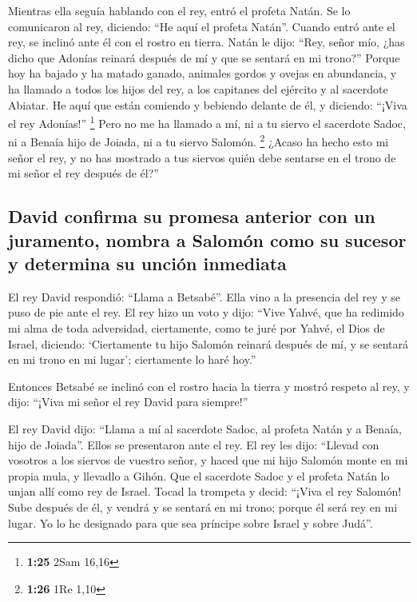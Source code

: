  Mientras ella seguía hablando con el rey, entró el
profeta Natán.  Se lo comunicaron al rey, diciendo: ``He
aquí el profeta Natán''. Cuando entró ante el rey, se inclinó ante él
con el rostro en tierra.  Natán le dijo: ``Rey, señor
mío, ¿has dicho que Adonías reinará después de mí y que se sentará en mi
trono?''  Porque hoy ha bajado y ha matado ganado,
animales gordos y ovejas en abundancia, y ha llamado a todos los hijos
del rey, a los capitanes del ejército y al sacerdote Abiatar. He aquí
que están comiendo y bebiendo delante de él, y diciendo: ``¡Viva el rey
Adonías!'' \footnote{\textbf{1:25} 2Sam 16,16}  Pero no
me ha llamado a mí, ni a tu siervo el sacerdote Sadoc, ni a Benaía hijo
de Joiada, ni a tu siervo Salomón. \footnote{\textbf{1:26} 1Re 1,10}
 ¿Acaso ha hecho esto mi señor el rey, y no has mostrado
a tus siervos quién debe sentarse en el trono de mi señor el rey después
de él?''

\hypertarget{david-confirma-su-promesa-anterior-con-un-juramento-nombra-a-salomuxf3n-como-su-sucesor-y-determina-su-unciuxf3n-inmediata}{%
\subsection{David confirma su promesa anterior con un juramento, nombra
a Salomón como su sucesor y determina su unción
inmediata}\label{david-confirma-su-promesa-anterior-con-un-juramento-nombra-a-salomuxf3n-como-su-sucesor-y-determina-su-unciuxf3n-inmediata}}

 El rey David respondió: ``Llama a Betsabé''. Ella vino a
la presencia del rey y se puso de pie ante el rey.  El
rey hizo un voto y dijo: ``Vive Yahvé, que ha redimido mi alma de toda
adversidad,  ciertamente, como te juré por Yahvé, el Dios
de Israel, diciendo: `Ciertamente tu hijo Salomón reinará después de mí,
y se sentará en mi trono en mi lugar'; ciertamente lo haré hoy.''

 Entonces Betsabé se inclinó con el rostro hacia la
tierra y mostró respeto al rey, y dijo: ``¡Viva mi señor el rey David
para siempre!''

 El rey David dijo: ``Llama a mí al sacerdote Sadoc, al
profeta Natán y a Benaía, hijo de Joiada''. Ellos se presentaron ante el
rey.  El rey les dijo: ``Llevad con vosotros a los
siervos de vuestro señor, y haced que mi hijo Salomón monte en mi propia
mula, y llevadlo a Gihón.  Que el sacerdote Sadoc y el
profeta Natán lo unjan allí como rey de Israel. Tocad la trompeta y
decid: ``¡Viva el rey Salomón!  Sube después de él, y
vendrá y se sentará en mi trono; porque él será rey en mi lugar. Yo lo
he designado para que sea príncipe sobre Israel y sobre Judá''.

